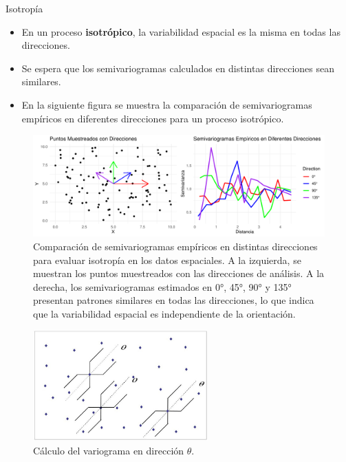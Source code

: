 \documentclass[
  10pt,
  ignorenonframetext,
]{beamer}
\begin{document}
\begin{frame}
\begin{block}{Isotropía}
\label{isotropuxeda}
\begin{itemize} \footnotesize
    \item En un proceso \textbf{isotrópico}, la variabilidad espacial es la misma en todas las direcciones.
    \item Se espera que los semivariogramas calculados en distintas direcciones sean similares.
    \item En la siguiente figura se muestra la comparación de semivariogramas empíricos en diferentes direcciones para un proceso isotrópico.
\end{itemize}

\begin{figure}

{\centering \includegraphics{imagenes/unnamed-chunk-6-1} 

}

\caption{Comparación de semivariogramas empíricos en distintas direcciones para evaluar isotropía en los datos espaciales. A la izquierda, se muestran los puntos muestreados con las direcciones de análisis. A la derecha, los semivariogramas estimados en 0°, 45°, 90° y 135° presentan patrones similares en todas las direcciones, lo que indica que la variabilidad espacial es independiente de la orientación.}\label{fig:unnamed-chunk-6}
\end{figure}
\end{block}
\end{frame}

\begin{frame}
\begin{figure}
    \centering
    \includegraphics[width=0.6\textwidth]{./imagenes/variograma-dir1.jpg}
    \caption{Cálculo del variograma en dirección $\theta$.}
\end{figure}
\end{frame}
\end{document}
